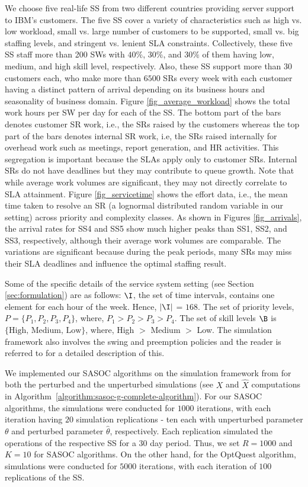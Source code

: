 \documentclass[11pt,letterpaper,english]{article}
\begin{document}
We choose five real-life SS from two different countries providing
server support to IBM's customers. The five SS cover a
variety of characteristics such as high vs. low workload, small
vs. large number of customers to be supported, small vs. big staffing
levels, and stringent vs. lenient SLA constraints. Collectively, these five SS staff more than 200 SWs with $40\%$, $30\%$, and $30\%$ of them having low, medium, and high skill level, respectively. Also, these SS support more than $30$ customers each, who make more than $6500$ SRs every week with each customer having a distinct pattern of arrival depending on its business hours and seasonality of business domain.
 Figure \ref{fig_average_workload} shows the total work hours per SW per day
for each of the SS. The bottom part of the bars denotes customer SR work,
i.e., the SRs raised by the customers whereas the top part of the bars
denotes internal SR work, i.e, the SRs raised internally for overhead work
such as meetings, report generation, and HR activities.  This
segregation is important because the SLAs apply only to customer SRs. Internal SRs
do not have deadlines but they may contribute to queue growth.  Note
that while average work volumes are significant, they may not directly
correlate to SLA attainment. Figure \ref{fig_servicetime} shows the effort data,
i.e., the mean time taken to resolve an SR (a lognormal distributed random variable in our setting)
across priority and complexity classes.
 As shown in Figures \ref{fig_arrivals}, the
arrival rates for SS4 and SS5 show much higher peaks than SS1, SS2,
and SS3, respectively, although their average work volumes are comparable. The
variations are significant because during the peak periods, many SRs
may miss their SLA deadlines and influence the optimal staffing
result.

Some of the specific details of the service system
setting (see Section \ref{sec:formulation}) are as follows:
$\I$, the set of time intervals, contains one element for each hour of the
week. Hence, $|\I|$ = $168$. 
The set of priority levels, $P=\{P_1, P_2, P_3, P_4\}$, where, $P_1 > P_2 >
P_3 > P_4$. The set of skill levels $\B$ is $\{\textrm{High, Medium, Low}\}$,
where, High $>$ Medium $>$ Low. The simulation framework also involves the
swing and preemption policies and the reader is referred to
\citep{banerjee2011simulation} for a detailed description of this.

We implemented our
SASOC algorithms on the simulation framework from
\citep{banerjee2011simulation} for both the perturbed and the
unperturbed simulations (see $X$ and $\hat{X}$ computations in
Algorithm~\ref{algorithm:sasoc-g-complete-algorithm}).
For our SASOC algorithms, the
simulations were conducted for $1000$ iterations, with each iteration
having $20$ simulation replications - ten each with unperturbed
parameter $\theta$ and perturbed parameter $\hat\theta$,
respectively.  Each replication simulated the operations of the
respective SS for a $30$ day period.  Thus, we set $R=1000$ and $K=10$
for SASOC algorithms. On the other hand, for the OptQuest algorithm,
simulations were conducted for $5000$ iterations, with each iteration
of $100$ replications of the SS.
\end{document}
